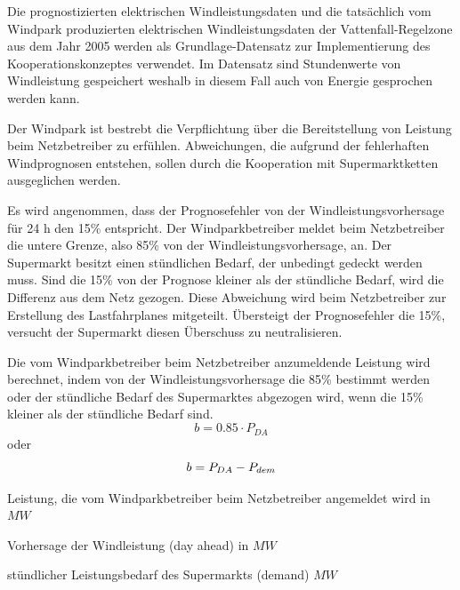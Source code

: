 Die prognostizierten elektrischen Windleistungsdaten und die tatsächlich vom
Windpark produzierten elektrischen Windleistungsdaten der Vattenfall-Regelzone
 aus dem Jahr 2005 werden als Grundlage-Datensatz zur
Implementierung des Kooperationskonzeptes verwendet. Im Datensatz sind
Stundenwerte von Windleistung gespeichert weshalb in diesem Fall auch von
Energie gesprochen werden kann.

Der Windpark ist bestrebt die Verpflichtung \"uber die Bereitstellung von
Leistung beim Netzbetreiber zu erf\"uhlen. Abweichungen, die aufgrund der
fehlerhaften Windprognosen entstehen, sollen durch die Kooperation mit
Supermarktketten ausgeglichen werden.

Es wird angenommen, dass der Prognosefehler von der Windleistungsvorhersage
f\"ur 24 h den 15\% entspricht. Der Windparkbetreiber meldet beim Netzbetreiber
die untere Grenze, also 85\% von der Windleistungsvorhersage, an. Der
Supermarkt besitzt einen st\"undlichen Bedarf, der unbedingt gedeckt werden
muss. Sind die 15\% von der Prognose kleiner als der st\"undliche Bedarf, wird
die Differenz aus dem Netz gezogen. Diese Abweichung wird beim Netzbetreiber zur
Erstellung des Lastfahrplanes mitgeteilt. \"Ubersteigt der Prognosefehler die
15\%, versucht der Supermarkt diesen \"Uberschuss zu neutralisieren.

Die vom Windparkbetreiber beim Netzbetreiber anzumeldende Leistung wird
berechnet, indem von der Windleistungsvorhersage die 85\% bestimmt werden
oder der st\"undliche Bedarf des Supermarktes abgezogen wird, wenn die 15\%
kleiner als der st\"undliche Bedarf sind.
\begin{equation*}
	b = 0.85 \cdot P_{DA}
\end{equation*}
oder
\begin{equation*}
	b = P_{DA} - P_{dem}\\
	\label{b}
\end{equation*}

 \begin{description}[\dth]
	\item[$b$] Leistung, die vom Windparkbetreiber beim Netzbetreiber
	angemeldet wird in $MW$
	\item[$P_{DA}$] Vorhersage der Windleistung (day ahead) in $MW$
	\item[$P_{dem}$] st\"undlicher Leistungsbedarf des Supermarkts (demand)
	$MW$
 \end{description} \vspace{0.5cm}

